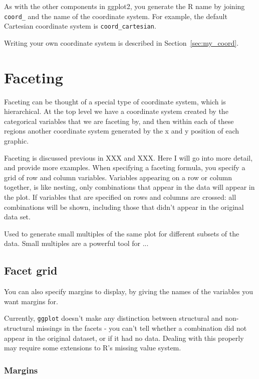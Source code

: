 As with the other components in ggplot2, you generate the R name by joining {\tt coord\_} and the name of the coordinate system.  For example, the default Cartesian coordinate system is {\tt coord\_cartesian}.

Writing your own coordinate system is described in Section~\ref{sec:my_coord}.


\section{Faceting}
\label{sec:faceting}

Faceting can be thought of a special type of coordinate system, which is hierarchical.  At the top level we have a coordinate system created by the categorical variables that we are faceting by, and then within each of these regions another coordinate system generated by the x and y position of each graphic.

Faceting is discussed previous in XXX and XXX.  Here I will go into more detail, and provide more examples.  When specifying a faceting formula, you specify a grid of row and column variables.  Variables appearing on a row or column together, is like nesting, only combinations that appear in the data will appear in the plot.  If variables that are specified on rows and columns are crossed: all combinations will be shown, including those that didn't appear in the original data set.

Used to generate small multiples of the same plot for different subsets of the data.  Small multiples are a powerful tool for ...  

\subsection{Facet grid}

You can also specify margins to display, by giving the names of the variables you want margins for.  


Currently, {\tt ggplot} doesn't make any distinction between structural and non-structural missings in the facets - you can't tell whether a combination did not appear in the original dataset, or if it had no data.  Dealing with this properly may require some extensions to R's missing value system.  


\subsubsection{Margins}\label{sub:margins}

